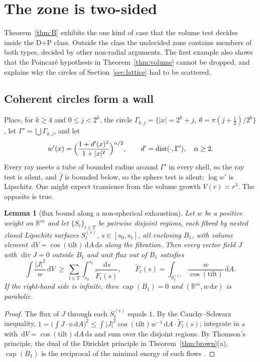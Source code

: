 \documentclass[11pt]{amsart}
\newcommand{\R}{\mathbb{R}}
\newcommand{\dd}{\,\mathrm{d}}
\newcommand{\abs}[1]{\lvert #1\rvert}
\newcommand{\fbar}{\bar f}
\DeclareMathOperator{\capa}{cap}
\DeclareMathOperator{\dist}{dist}
\DeclareMathOperator{\divg}{div}
\theoremstyle{plain}
\newtheorem{lemma}[theorem]{Lemma}
\theoremstyle{definition}
\theoremstyle{remark}
\begin{document}
\section{The zone is two-sided}\label{sec:zone}

Theorem~\ref{thm:B} exhibits the one kind of case that the volume test decides
inside the D+P class. Outside the class the undecided zone contains members of
both types, decided by other non-radial arguments. The first example also shows
that the Poincar\'e hypothesis in Theorem~\ref{thm:volume} cannot be dropped,
and explains why the circles of Section~\ref{sec:lattice} had to be scattered.

\subsection{Coherent circles form a wall}\label{sec:wall}
Place, for $k\ge4$ and $0\le j<2^k$, the circle
$\Gamma_{k,j}=\{\abs x=2^k+j,\ \theta=\pi(j+\frac12)/2^k\}$, let
$\Gamma'=\bigcup\Gamma_{k,j}$, and let
\begin{equation}\label{eq:wall}
w'(x)=\Bigl(\frac{1+d'(x)^2}{1+\abs x^2}\Bigr)^{\alpha/2},\qquad
d'=\dist(\cdot,\Gamma'),\quad\alpha\ge2 .
\end{equation}
Every ray meets a tube of bounded radius around $\Gamma'$ in every shell, so the ray test is
silent, and $\fbar$ is bounded below, so the sphere test is silent; $\log w'$ is
Lipschitz. One might expect transience from the volume growth
$V(r)\asymp r^3$. The opposite is true.

\begin{lemma}[flux bound along a non-spherical exhaustion]\label{lem:thomson}
Let $w$ be a positive weight on $\R^m$ and let $\{S_t\}_{t\in T}$ be pairwise
disjoint regions, each fibred by nested closed Lipschitz surfaces $S_t^{(s)}$,
$s\in[s_0,s_1]$, all enclosing $B_1$, with volume element
$\dd V=\cos(\mathrm{tilt})\dd A\dd s$ along the fibration. Then every vector
field $J$ with $\divg J=0$ outside $B_1$ and unit flux out of $B_1$ satisfies
\[
\int\frac{\abs J^2}{w}\dd V\ \ge\ \sum_{t\in T}\int_{s_0}^{s_1}\frac{\dd s}{\tilde F_t(s)},
\qquad \tilde F_t(s)=\int_{S_t^{(s)}}\frac{w}{\cos(\mathrm{tilt})}\dd A .
\]
If the right-hand side is infinite, then $\capa(B_1)=0$ and $(\R^m,w\dd x)$ is
parabolic.
\end{lemma}

\begin{proof}
The flux of $J$ through each $S_t^{(s)}$ equals $1$. By the Cauchy--Schwarz
inequality,
$1=\bigl(\int J\cdot n\dd A\bigr)^2\le\int\abs{J}^2\cos(\mathrm{tilt})w^{-1}\dd A
\cdot\tilde F_t(s)$; integrate in $s$ with $\dd V=\cos(\mathrm{tilt})\dd A\dd s$
and sum over the disjoint regions. By Thomson's principle, the dual of the
Dirichlet principle in Theorem~\ref{thm:brown}(a), $\capa(B_1)$ is the
reciprocal of the minimal energy of such flows \cite[\S7]{grigoryan1999}.
\end{proof}
\end{document}
